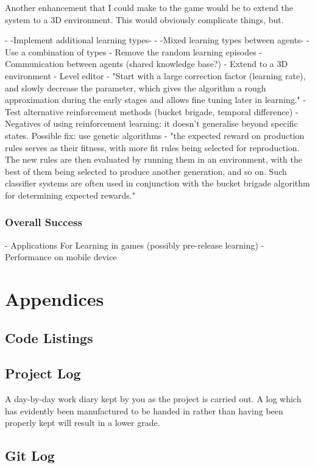 \documentclass[a4paper,oneside]{report}
\begin{document}
Another enhancement that I could make to the game would be to extend the system to a 3D environment. This would obviously complicate things, but.

- -Implement additional learning types-
- -Mixed learning types between agents-
- Use a combination of types
- Remove the random learning episodes
- Communication between agents (shared knowledge base?)
- Extend to a 3D environment
- Level editor
- "Start with a large correction factor (learning rate), and slowly decrease the parameter, which gives the algorithm a rough approximation during the early stages and allows fine tuning later in learning."
- Test alternative reinforcement methods (bucket brigade, temporal difference)
- Negatives of using reinforcement learning: it doesn't generalise beyond specific states. Possible fix: use genetic algorithms - "the expected reward on production rules serves as their fitness, with more fit rules being selected for reproduction. The new rules are then evaluated by running them in an environment, with the best of them being selected to produce another generation, and so on. Such classifier systems are often used in conjunction with the bucket brigade algorithm for determining expected rewards." 

\section{Overall Success}
- Applications For Learning in games (possibly pre-release learning)
- Performance on mobile device

%
%
\part{Appendices}{}

	\appendix
	
	\chapter{Code Listings}

	\chapter{Project Log}
	
A day-by-day work diary kept by you as the project is carried out. A log which has evidently been manufactured to be handed in rather than having been properly kept will result in a lower grade.

	\chapter{Git Log}
	
\newpage


\end{document}
